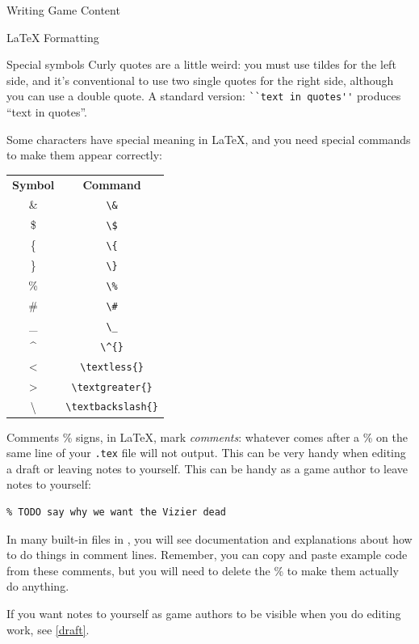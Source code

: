 \documentclass[sheet]{GameTexBase}
\begin{document}
\begin{section}{Writing Game Content}
\begin{subsection}{\LaTeX{} Formatting}
\begin{subsubsection}{Special symbols}
Curly quotes are a little weird: you must use tildes for the left side, and it's conventional to use two single quotes for the right side, although you can use a double quote.  A standard version: \lstinline{``text in quotes''} produces ``text in quotes''.

Some characters have special meaning in \LaTeX{}, and you need special commands to make them appear correctly:

\begin{center}
\begin{tabular}{c c}
 \textbf{Symbol} & \textbf{Command} \\
 \& & \lstinline|\&| \\
 \$ & \lstinline|\$| \\
 \{ & \lstinline|\{| \\
 \} & \lstinline|\}| \\
 \% & \lstinline|\%| \\
 \# & \lstinline|\#| \\
 \_ & \lstinline|\_| \\
 \^{} & \lstinline|\^{}| \\
 \textless & \lstinline|\textless{}| \\
 \textgreater & \lstinline|\textgreater{}| \\
 \textbackslash & \lstinline|\textbackslash{}|
\end{tabular}
\end{center}
\end{subsubsection}
\begin{subsubsection}{Comments}
\% signs, in \LaTeX{}, mark \textit{comments}: whatever comes after a \% on the same line of your \texttt{.tex} file will not output.  This can be very handy when editing a draft or leaving notes to yourself.
This can be handy as a game author to leave notes to yourself:
\begin{verbatim}
% TODO say why we want the Vizier dead
\end{verbatim}
In many built-in files in \gametex{}, you will see documentation and explanations about how to do things in comment lines.  Remember, you can copy and paste example code from these comments, but you will need to delete the \% to make them actually do anything.

If you want notes to yourself as game authors to be visible when you do editing work, see \ref{draft}.
\end{subsubsection}


\end{subsection}
\end{section}
\end{document}
